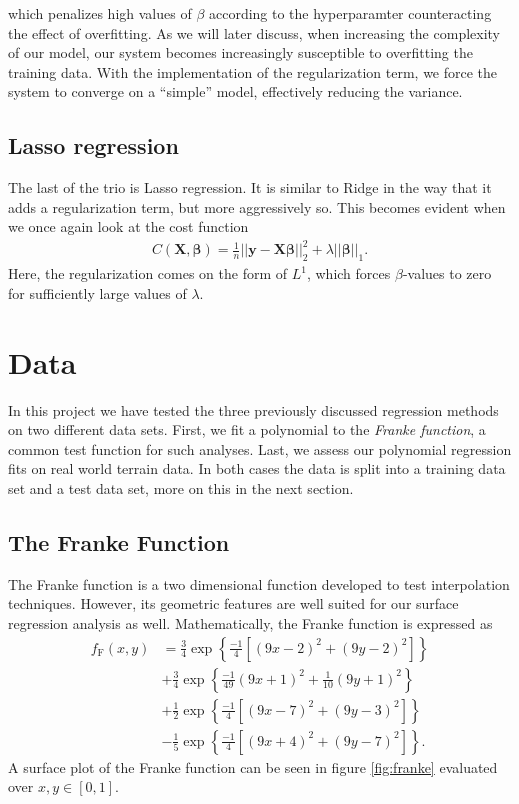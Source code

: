 \documentclass[a4paper, twocolumn]{article}
\begin{document}
which penalizes high values of $\beta$ according to the hyperparamter   counteracting the effect of overfitting. As we will later discuss, when increasing the complexity of our model, our system becomes increasingly susceptible to overfitting the training data. With the implementation of the regularization term, we force the system to converge on a ``simple'' model, effectively reducing the variance. 

\subsection{Lasso regression}
The last of the trio is Lasso regression. It is similar to Ridge in the way that it adds a regularization term, but more aggressively so. This becomes evident when we once again look at the cost function
\begin{align}
  C(\boldsymbol{X},\boldsymbol{\beta})=\frac{1}{n}\vert\vert \boldsymbol{y}-\boldsymbol{X}\boldsymbol{\beta}\vert\vert_2^2+\lambda\vert\vert \boldsymbol{\beta}\vert\vert_1.
\end{align}
Here, the regularization comes on the form of $L^1$, which forces $\beta$-values to zero for sufficiently large values of $\lambda$.


\section{Data}
In this project we have tested the three previously discussed regression methods on two different data sets. First, we fit a polynomial to the \textit{Franke function}, a common test function for such analyses. Last, we assess our polynomial regression fits on real world terrain data. In both cases the data is split into a training data set and a test data set, more on this in the next section.
\subsection{The Franke Function}
The Franke function is a two dimensional function developed to test interpolation techniques. However, its geometric features are well suited for our surface regression analysis as well. Mathematically, the Franke function is expressed as
\begin{align}
f_\text{F}(x,y) &= \frac{3}{4}\exp\left\{\frac{-1}{4}\left[\left(9x-2\right)^2 + \left(9y-2\right)^2\right]\right\}\nonumber \\
&+ \frac{3}{4}\exp\left\{\frac{-1}{49}\left(9x+1\right)^2 + \frac{1}{10}\left(9y+1\right)^2\right\}\nonumber \\
&+ \frac{1}{2}\exp\left\{\frac{-1}{4}\left[\left(9x-7\right)^2 + \left(9y-3\right)^2\right]\right\}\nonumber \\
&- \frac{1}{5}\exp\left\{\frac{-1}{4}\left[\left(9x+4\right)^2 + \left(9y-7\right)^2\right]\right\}.
\end{align}
A surface plot of the Franke function can be seen in figure \ref{fig:franke} evaluated over $x,y \in [0,1]$. 
\end{document}
